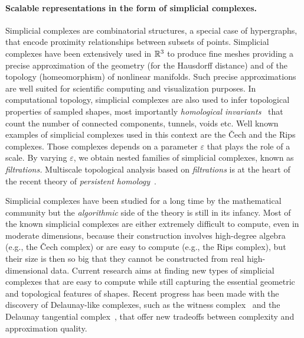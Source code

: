 \paragraph{Scalable representations in the form of simplicial complexes.}  
Simplicial complexes are combinatorial structures, a special case of hypergraphs, that encode proximity relationships between subsets of points.
Simplicial complexes have been extensively used in $\mathbb R ^3$ to produce fine meshes  providing a precise approximation of the geometry  (for the Hausdorff distance) and of the topology  (homeomorphism) of nonlinear manifolds.  Such precise approximations are
 well suited for scientific computing and visualization purposes.  In computational topology, simplicial complexes are also used to infer topological properties of sampled shapes, most importantly {\em homological invariants}~\cite{ah-at-2002} that count the number of connected components, tunnels, voids etc.  Well known examples of simplicial complexes used in this context are the \v{C}ech and the Rips complexes. Those complexes depends on a parameter $\varepsilon$ that plays the role of a  scale.
By varying $\varepsilon$, we obtain nested families of simplicial complexes, known as {\em filtrations.}
Multiscale topological analysis based on {\em filtrations} is at the heart of the recent theory of {\em persistent homology}~\cite{hh-ct-2010,az-tfc-2009}.
 
Simplicial complexes have been studied for a long time by the mathematical community but the {\em algorithmic} side of the theory is still in its infancy. Most of the known simplicial complexes are either extremely difficult to compute, even in moderate dimensions, because their construction involves high-degree algebra (e.g., the  \v{C}ech complex) or are easy to compute (e.g., the Rips complex), but their size is then so big that they cannot be constructed from real high-dimensional data. Current research aims at finding new types of simplicial complexes that are easy to compute while still capturing the essential geometric and topological features of shapes. Recent progress has been made with the discovery of Delaunay-like complexes, such as the witness complex~\cite{cds-tewc-2004} and the Delaunay tangential complex~\cite{geometrica-7142i}, that offer new tradeoffs between complexity and approximation quality.

